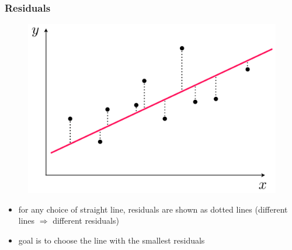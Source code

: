 \documentclass[english,14pt]{beamer}
\newcommand\red[1]{{\color{red} #1}}
\begin{document}

\begin{frame}[fragile]

\frametitle{Residuals}


\vspace*{-3mm}
\begin{figure}[ht]
	\centering
	\includegraphics[width=.7\textwidth]{figures/residuals}
\end{figure}
\vspace*{-3mm}
\begin{itemize}
	\item for any choice of straight line, \red{residuals} are shown as dotted lines (different lines $\Rightarrow$ different residuals)
	\item goal is to choose the line with the smallest residuals
\end{itemize}

\end{frame}

\end{document}
